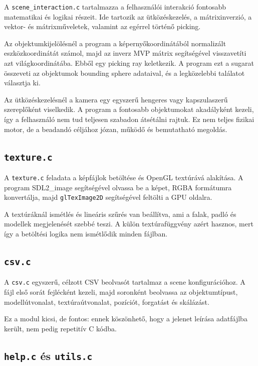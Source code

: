 \documentclass[12pt,a4paper]{article}
\newcommand{\code}[1]{\texttt{#1}}
\begin{document}
A \code{scene\_interaction.c} tartalmazza a felhasználói interakció fontosabb matematikai és logikai részeit. Ide tartozik az ütközéskezelés, a mátrixinverzió, a vektor- és mátrixműveletek, valamint az egérrel történő picking.

Az objektumkijelölésnél a program a képernyőkoordinátából normalizált eszközkoordinátát számol, majd az inverz MVP mátrix segítségével visszavetíti azt világkoordinátába. Ebből egy picking ray keletkezik. A program ezt a sugarat összeveti az objektumok bounding sphere adataival, és a legközelebbi találatot választja ki.

Az ütközéskezelésnél a kamera egy egyszerű hengeres vagy kapszulaszerű szereplőként viselkedik. A program a fontosabb objektumokat akadályként kezeli, így a felhasználó nem tud teljesen szabadon átsétálni rajtuk. Ez nem teljes fizikai motor, de a beadandó céljához józan, működő és bemutatható megoldás.

\subsection{\code{texture.c}}

A \code{texture.c} feladata a képfájlok betöltése és OpenGL textúrává alakítása. A program SDL2\_image segítségével olvassa be a képet, RGBA formátumra konvertálja, majd \code{glTexImage2D} segítségével feltölti a GPU oldalra.

A textúráknál ismétlés és lineáris szűrés van beállítva, ami a falak, padló és modellek megjelenését szebbé teszi. A külön textúrafüggvény azért hasznos, mert így a betöltési logika nem ismétlődik minden fájlban.

\subsection{\code{csv.c}}

A \code{csv.c} egyszerű, célzott CSV beolvasót tartalmaz a scene konfigurációhoz. A fájl első sorát fejlécként kezeli, majd soronként beolvassa az objektumtípust, modellútvonalat, textúraútvonalat, pozíciót, forgatást és skálázást.

Ez a modul kicsi, de fontos: ennek köszönhető, hogy a jelenet leírása adatfájlba került, nem pedig repetitív C kódba.

\subsection{\code{help.c} és \code{utils.c}}
\end{document}
